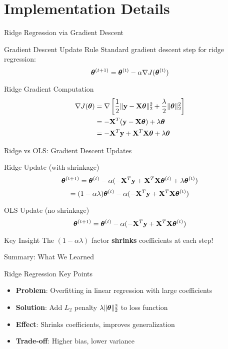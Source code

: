 \documentclass{beamer}
\begin{document}
\section{Implementation Details}

\begin{frame}{Ridge Regression via Gradient Descent}
\begin{theorembox}{Gradient Descent Update Rule}
Standard gradient descent step for ridge regression:
$$\boldsymbol{\theta}^{(t+1)} = \boldsymbol{\theta}^{(t)} - \alpha \nabla J(\boldsymbol{\theta}^{(t)})$$
\end{theorembox}
\pause

\begin{codebox}{Ridge Gradient Computation}
\begin{align}
\nabla J(\boldsymbol{\theta}) &= \nabla \left[\frac{1}{2}\|\mathbf{y}-\mathbf{X}\boldsymbol{\theta}\|_2^2 + \frac{\lambda}{2}\|\boldsymbol{\theta}\|_2^2\right] \\
&= -\mathbf{X}^T(\mathbf{y}-\mathbf{X}\boldsymbol{\theta}) + \lambda\boldsymbol{\theta} \\
&= -\mathbf{X}^T\mathbf{y} + \mathbf{X}^T\mathbf{X}\boldsymbol{\theta} + \lambda\boldsymbol{\theta}
\end{align}
\end{codebox}
\end{frame}

\begin{frame}{Ridge vs OLS: Gradient Descent Updates}
\begin{theorembox}{Ridge Update (with shrinkage)}
$$\boldsymbol{\theta}^{(t+1)} = \boldsymbol{\theta}^{(t)} - \alpha(-\mathbf{X}^T\mathbf{y} + \mathbf{X}^T\mathbf{X}\boldsymbol{\theta}^{(t)} + \lambda\boldsymbol{\theta}^{(t)})$$
$$= (1 - \alpha\lambda)\boldsymbol{\theta}^{(t)} - \alpha(-\mathbf{X}^T\mathbf{y} + \mathbf{X}^T\mathbf{X}\boldsymbol{\theta}^{(t)})$$
\end{theorembox}
\pause

\begin{theorembox}{OLS Update (no shrinkage)}
$$\boldsymbol{\theta}^{(t+1)} = \boldsymbol{\theta}^{(t)} - \alpha(-\mathbf{X}^T\mathbf{y} + \mathbf{X}^T\mathbf{X}\boldsymbol{\theta}^{(t)})$$
\end{theorembox}
\pause

\begin{keypointsbox}{Key Insight}
The $(1 - \alpha\lambda)$ factor \textbf{shrinks} coefficients at each step!
\end{keypointsbox}
\end{frame}

\begin{frame}{Summary: What We Learned}
\begin{keypointsbox}{Ridge Regression Key Points}
\begin{itemize}
\item \textbf{Problem}: Overfitting in linear regression with large coefficients
\item \textbf{Solution}: Add $L_2$ penalty $\lambda\|\boldsymbol{\theta}\|_2^2$ to loss function
\item \textbf{Effect}: Shrinks coefficients, improves generalization
\item \textbf{Trade-off}: Higher bias, lower variance
\end{itemize}
\end{keypointsbox}
\end{frame}
\end{document}
